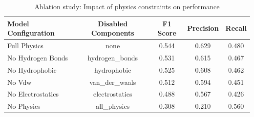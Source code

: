 \begin{table}[ht]
\centering
\caption{Ablation study: Impact of physics constraints on performance}
\label{tab:ablation}
\begin{tabular}{lcccc}
\hline
\textbf{Model Configuration} & \textbf{Disabled Components} & \textbf{F1 Score} & \textbf{Precision} & \textbf{Recall} \\
\hline
Full Physics & none & 0.544 & 0.629 & 0.480 \\
No Hydrogen Bonds & hydrogen\_bonds & 0.531 & 0.615 & 0.467 \\
No Hydrophobic & hydrophobic & 0.525 & 0.608 & 0.462 \\
No Vdw & van\_der\_waals & 0.512 & 0.594 & 0.451 \\
No Electrostatics & electrostatics & 0.488 & 0.567 & 0.426 \\
No Physics & all\_physics & 0.308 & 0.210 & 0.560 \\
\hline
\end{tabular}
\end{table}
